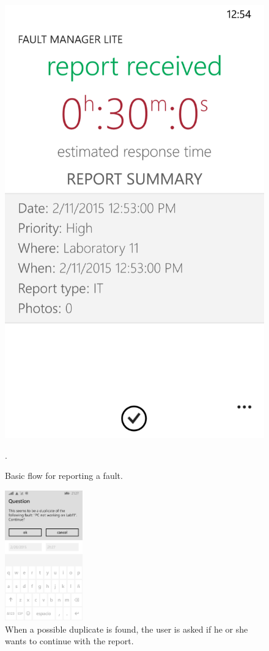 \documentclass{report}
\begin{document}
\begin{figure}[hbtp]
\begin{minipage}{0.3\textwidth}
\includegraphics[width=\textwidth]{img/ReportReceived.png}
\end{minipage}
\caption{Basic flow for reporting a fault.}
\label{imgReportFlow}.
\end{figure}

\begin{figure}[hbtp]
\centering
\includegraphics[width=0.3\textwidth]{img/DuplicateMessage.jpg}
\caption{When a possible duplicate is found, the user is asked if he or she wants to continue with the report.}
\label{imgDuplicateReport}
\end{figure}
\end{document}
